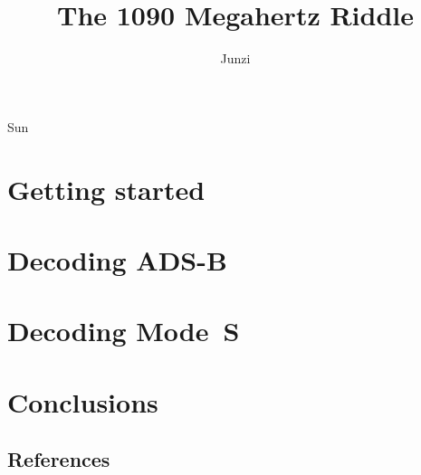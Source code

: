 \documentclass[openany]{r1090}                %
\date{}
\newcommand\1{\texttt{1}}
\newcommand\0{\texttt{0}}
\begin{document}
\title[A Guide to Decoding Mode S and ADS-B Signals]{The 1090 Megahertz Riddle}
\author{Junzi}{Sun}





\dedication{
  This book is dedicated to my sons: William and Vincent
}

\setcounter{tocdepth}{1}
\tableofcontents



\part{Getting started}



\part{Decoding ADS-B}









\part{Decoding Mode~S}










\part{Conclusions}



\chapter*{References}
\printbibliography[heading=none]




\end{document}
